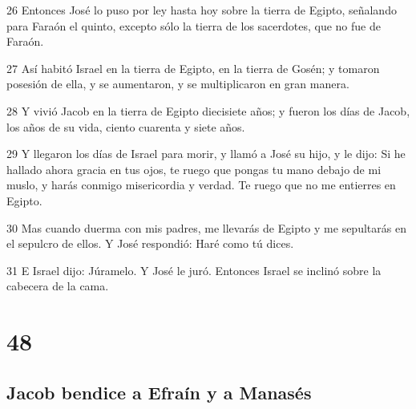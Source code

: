 \par 26 Entonces José lo puso por ley hasta hoy sobre la tierra de Egipto, señalando para Faraón el quinto, excepto sólo la tierra de los sacerdotes, que no fue de Faraón.
\par 27 Así habitó Israel en la tierra de Egipto, en la tierra de Gosén; y tomaron posesión de ella, y se aumentaron, y se multiplicaron en gran manera.
\par 28 Y vivió Jacob en la tierra de Egipto diecisiete años; y fueron los días de Jacob, los años de su vida, ciento cuarenta y siete años.
\par 29 Y llegaron los días de Israel para morir, y llamó a José su hijo, y le dijo: Si he hallado ahora gracia en tus ojos, te ruego que pongas tu mano debajo de mi muslo, y harás conmigo misericordia y verdad. Te ruego que no me entierres en Egipto.
\par 30 Mas cuando duerma con mis padres, me llevarás de Egipto y me sepultarás en el sepulcro de ellos. Y José respondió: Haré como tú dices.
\par 31 E Israel dijo: Júramelo. Y José le juró. Entonces Israel se inclinó sobre la cabecera de la cama.

\chapter{48}

\section*{Jacob bendice a Efraín y a Manasés}

